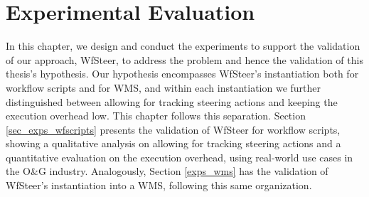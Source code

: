 \chapter{Experimental Evaluation} \label{chap6}

In this chapter, we design and conduct the experiments to support
the validation of our approach, WfSteer, to address the problem 
and hence the validation of this thesis's hypothesis.
Our hypothesis encompasses WfSteer's instantiation both for workflow scripts and for WMS, and within each instantiation we further distinguished between allowing for tracking steering actions and keeping the execution overhead low. This chapter follows this separation. 
Section \ref{sec_exps_wfscripts} presents the validation of WfSteer for workflow scripts, showing a qualitative analysis on allowing for tracking steering actions and a quantitative evaluation on the execution overhead, using real-world use cases in the O\&G industry. Analogously, Section \ref{exps_wms} has the validation of WfSteer's instantiation into a WMS, following this same organization.





